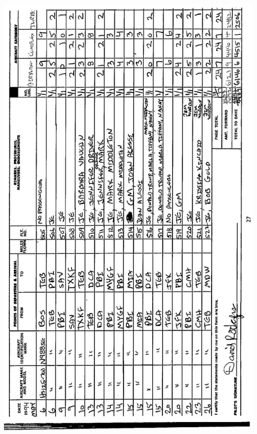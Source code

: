 \documentclass[10pt]{article}
\begin{document}
\includegraphics[max width=\textwidth, center]{2025_02_27_dd68c3d38de88f0516d9g-031}\\
\end{document}
